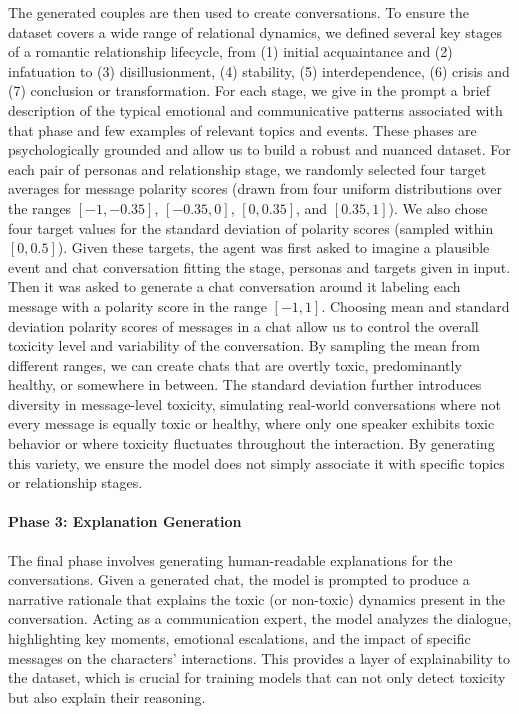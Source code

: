\documentclass[twocolumn]{ceurart}
\begin{document}
The generated couples are then used to create conversations. To ensure the dataset covers a wide range of relational dynamics, we defined several key stages of a romantic relationship lifecycle, from (1) initial acquaintance and (2) infatuation to (3) disillusionment, (4) stability, (5) interdependence, (6) crisis and (7) conclusion or transformation. For each stage, we give in the prompt a brief description of the typical emotional and communicative patterns associated with that phase and few examples of relevant topics and events. These phases are psychologically grounded and allow us to build a robust and nuanced dataset. For each pair of personas and relationship stage, we randomly selected four target averages for message polarity scores (drawn from four uniform distributions over the ranges $[-1, -0.35]$, $[-0.35, 0]$, $[0, 0.35]$, and $[0.35, 1]$). We also chose four target values for the standard deviation of polarity scores (sampled within $[0, 0.5]$). Given these targets, the agent was first asked to imagine a plausible event and chat conversation fitting the stage, personas and targets given in input. Then it was asked to generate a chat conversation around it labeling each message with a polarity score in the range $[-1, 1]$. Choosing mean and standard deviation polarity scores of messages in a chat allow us to control the overall toxicity level and variability of the conversation. By sampling the mean from different ranges, we can create chats that are overtly toxic, predominantly healthy, or somewhere in between. The standard deviation further introduces diversity in message-level toxicity, simulating real-world conversations where not every message is equally toxic or healthy, where only one speaker exhibits toxic behavior or where toxicity fluctuates throughout the interaction. By generating this variety, we ensure the model does not simply associate it with specific topics or relationship stages.

\paragraph{Phase 3: Explanation Generation}

The final phase involves generating human-readable explanations for the conversations. Given a generated chat, the model is prompted to produce a narrative rationale that explains the toxic (or non-toxic) dynamics present in the conversation. Acting as a communication expert, the model analyzes the dialogue, highlighting key moments, emotional escalations, and the impact of specific messages on the characters' interactions. This provides a layer of explainability to the dataset, which is crucial for training models that can not only detect toxicity but also explain their reasoning.
\end{document}
